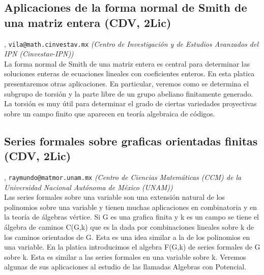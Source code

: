 \subsection{\sffamily Aplicaciones de la forma normal de Smith de una matriz entera {\footnotesize (CDV, 2Lic)}} \label{reg-423} 
, {\tt vila@math.cinvestav.mx}  {\slshape (Centro de Investigaci\'on y de Estudios Avanzados del IPN (Cinvestav-IPN))}\\
          \noindent La forma normal de Smith de una matriz entera es central para determinar las soluciones enteras de ecuaciones lineales con coeficientes enteros. En esta platica presentaremos otras aplicaciones. En particular, veremos como se determina el subgrupo de torsi\'on y la parte libre de un grupo abeliano finitamente generado. La torsi\'on es muy \'util para determinar el grado de ciertas variedades proyectivas  sobre un campo finito que aparecen en teor\'ia algebraica de c\'odigos.
\subsection{\sffamily Series formales sobre graficas orientadas finitas {\footnotesize (CDV, 2Lic)}} \label{reg-321} 
, {\tt raymundo@matmor.unam.mx}  {\slshape (Centro de Ciencias Matem\'aticas (CCM) de la Universidad Nacional Aut\'onoma de M\'exico (UNAM))}\\
          \noindent Las series formales sobre una variable son una extensi\'on natural de los polinomios sobre una variable y tienen muchas aplicaciones en combinatoria y en la teor\'ia de \'algebras v\'ertice. Si G es una grafica finita y k es un campo se tiene el \'algebra de caminos C(G,k) que es la dada por combinaciones lineales sobre k de los caminos orientados de G. Esta es una idea similar a la de los polinomios en una variable. En la platica introducimos el algebra F(G,k) de series formales de G sobre k. Esta es similar a las series formales en una variable sobre k. Veremos algunas de sus aplicaciones al estudio de las llamadas Algebras con Potencial.
